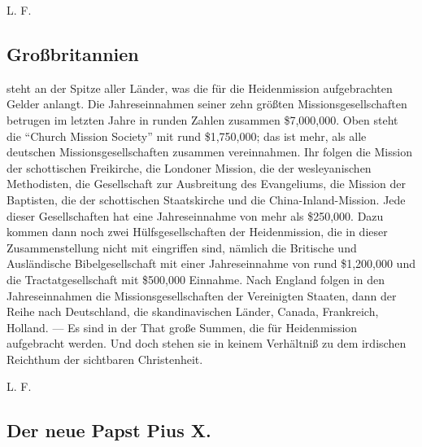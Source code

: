 L. F.

\subsection{Großbritannien}

steht an der Spitze aller Länder, was die für die Heidenmission aufgebrachten Gelder anlangt. Die Jahreseinnahmen seiner zehn größten Missionsgesellschaften betrugen im letzten Jahre in runden Zahlen zusammen \$7,000,000. Oben steht die “Church Mission Society” mit rund \$1,750,000; das ist mehr, als alle deutschen Missionsgesellschaften zusammen vereinnahmen. Ihr folgen die Mission der schottischen Freikirche, die Londoner Mission, die der wesleyanischen Methodisten, die Gesellschaft zur Ausbreitung des Evangeliums, die Mission der Baptisten, die der schottischen Staatskirche und die China-Inland-Mission. Jede dieser Gesellschaften hat eine Jahreseinnahme von mehr als \$250,000. Dazu kommen dann noch zwei Hülfsgesellschaften der Heidenmission, die in dieser Zusammenstellung nicht mit eingriffen sind, nämlich die Britische und Ausländische Bibelgesellschaft mit einer Jahreseinnahme von rund \$1,200,000 und die Tractatgesellschaft mit \$500,000 Einnahme. Nach England folgen in den Jahreseinnahmen die Missionsgesellschaften der Vereinigten Staaten, dann der Reihe nach Deutschland, die skandinavischen Länder, Canada, Frankreich, Holland. — Es sind in der That große Summen, die für Heidenmission aufgebracht werden. Und doch stehen sie in keinem Verhältniß zu dem irdischen Reichthum der sichtbaren Christenheit.

L. F.

\subsection{Der neue Papst Pius X.}

